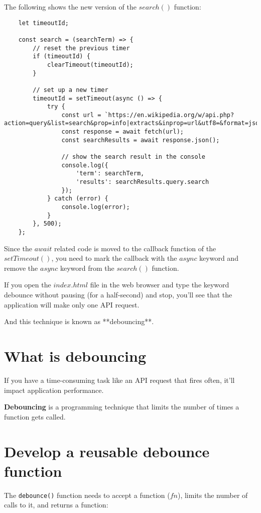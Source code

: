 \documentclass[11pt]{article}
\begin{document}
\noindent
The following shows the new version of the $search()$ function:

\begin{lstlisting}
    let timeoutId;

    const search = (searchTerm) => {
        // reset the previous timer
        if (timeoutId) {
            clearTimeout(timeoutId);
        }

        // set up a new timer
        timeoutId = setTimeout(async () => {
            try {
                const url = `https://en.wikipedia.org/w/api.php?action=query&list=search&prop=info|extracts&inprop=url&utf8=&format=json&origin=*&srlimit=10&srsearch=${searchTerm}`;
                const response = await fetch(url);
                const searchResults = await response.json();

                // show the search result in the console
                console.log({
                    'term': searchTerm,
                    'results': searchResults.query.search
                });
            } catch (error) {
                console.log(error);
            }
        }, 500);
    };
\end{lstlisting}

Since the $await$ related code is moved to the callback function of
the $setTimeout()$, you need to mark the callback with the $async$ keyword
and remove the $async$ keyword from the $search()$ function.

If you open the $index.html$ file in the web browser and type the keyword
debounce without pausing (for a half-second) and stop, you'll see
that the application will make only one API request.

And this technique is known as **debouncing**.

\section*{What is debouncing}

If you have a time-consuming task like an API request that fires often,
it'll impact application performance.

\textbf{Debouncing} is a programming technique that limits the number of
times a function gets called.

\section*{Develop a reusable debounce function}

The \verb|debounce()| function needs to accept a function ($fn$), limits the
number of calls to it, and returns a function:
\end{document}
